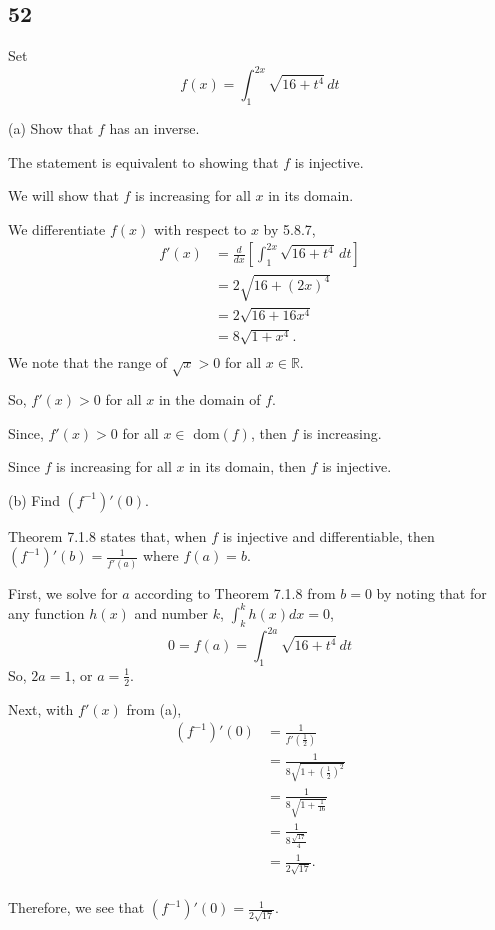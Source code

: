 \documentclass[../hw7.tex]{subfiles}
\begin{document}
\subsection*{52}
Set \[f(x)=\int_{1}^{2x} \sqrt{16+t^4}\,dt\]


(a) Show that $f$ has an inverse.

The statement is equivalent to showing that $f$ is injective.

We will show that $f$ is increasing for all $x$ in its domain.

We differentiate $f(x)$ with respect to $x$ by 5.8.7,
\begin{align*}
    f'(x)&=\frac{d}{dx}\left[ \int_{1}^{2x} \sqrt{16+t^4}\,dt \right] \\
    &= 2\sqrt{16+{(2x)}^4} \\
    &= 2\sqrt{16+16x^4} \\
    &= 8\sqrt{1+x^4}. \\
\end{align*}
We note that the range of $\sqrt{x}>0$ for all $x \in \mathbb{R}$.

So, $f'(x)>0$ for all $x$ in the domain of $f$.

Since, $f'(x)>0$ for all $x\in$ dom$(f)$, then $f$ is increasing.

Since $f$ is increasing for all $x$ in its domain, then $f$ is injective. %

(b) Find ${\left(f^{-1}\right)}'(0)$.

Theorem 7.1.8 states that, when $f$ is injective and differentiable, then ${\left(f^{-1}\right)}'(b)=\frac{1}{f'(a)}$ where $f(a)=b$.

First, we solve for $a$ according to Theorem 7.1.8 from $b=0$ by noting that for any function $h(x)$ and number $k$, $\int_{k}^{k} h(x)dx=0$,
\[0=f(a)=\int_{1}^{2a}\sqrt{16+t^4}\,dt\]
So, $2a=1$, or $a=\frac{1}{2}$.

Next, with $f'(x)$ from (a),
\begin{align*}
    \left( f^{-1} \right)'(0)&=\frac{1}{f'\left( \frac{1}{2} \right)}\\
    &= \frac{1}{8\sqrt{1+{\left( \frac{1}{2} \right)}^2}} \\
    &= \frac{1}{8\sqrt{1+\frac{1}{16}}} \\
    &= \frac{1}{8\frac{\sqrt{17}}{4}} \\
    &= \frac{1}{2\sqrt{17}}. \\
\end{align*}

Therefore, we see that $\left(f^{-1}\right)'(0)=\frac{1}{2\sqrt{17}}$.
\end{document}
